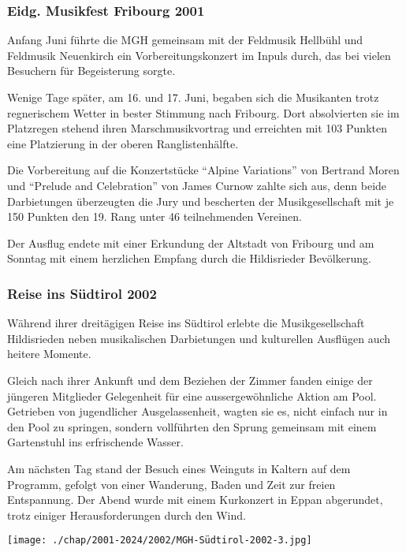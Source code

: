 \begin{history}
    \subsubsection{Eidg. Musikfest Fribourg 2001}

    Anfang Juni führte die MGH gemeinsam mit der Feldmusik Hellbühl und
    Feldmusik Neuenkirch ein Vorbereitungskonzert im Inpuls durch, das bei
    vielen Besuchern für Begeisterung sorgte.

    Wenige Tage später, am 16. und 17. Juni, begaben sich die Musikanten trotz
    regnerischem Wetter in bester Stimmung nach Fribourg. Dort absolvierten sie
    im Platzregen stehend ihren Marschmusikvortrag und erreichten mit 103
    Punkten eine Platzierung in der oberen Ranglistenhälfte.

    Die Vorbereitung auf die Konzertstücke \enquote{Alpine Variations} von
    Bertrand Moren und \enquote{Prelude and Celebration} von James Curnow zahlte
    sich aus, denn beide Darbietungen überzeugten die Jury und bescherten der
    Musikgesellschaft mit je 150 Punkten den 19. Rang unter 46 teilnehmenden
    Vereinen.

    Der Ausflug endete mit einer Erkundung der Altstadt von Fribourg und am
    Sonntag mit einem herzlichen Empfang durch die Hildisrieder Bevölkerung.

    \subsubsection{Reise ins Südtirol 2002}
    Während ihrer dreitägigen Reise ins Südtirol erlebte die Musikgesellschaft
    Hildisrieden neben musikalischen Darbietungen und kulturellen Ausflügen auch
    heitere Momente.

    Gleich nach ihrer Ankunft und dem Beziehen der Zimmer fanden einige der
    jüngeren Mitglieder Gelegenheit für eine aussergewöhnliche Aktion am Pool.
    Getrieben von jugendlicher Ausgelassenheit, wagten sie es, nicht einfach nur
    in den Pool zu springen, sondern vollführten den Sprung gemeinsam mit einem
    Gartenstuhl ins erfrischende Wasser.

    Am nächsten Tag stand der Besuch eines Weinguts in Kaltern auf dem Programm,
    gefolgt von einer Wanderung, Baden und Zeit zur freien Entspannung. Der
    Abend wurde mit einem Kurkonzert in Eppan abgerundet, trotz einiger
    Herausforderungen durch den Wind.

    \begin{MulticolFigure}
        \centering
        \texttt{[image: ./chap/2001-2024/2002/MGH-Südtirol-2002-3.jpg]}
    \end{MulticolFigure}


\end{history}
